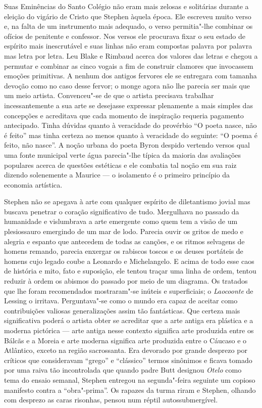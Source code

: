 Suas Eminências do Santo Colégio não eram mais zelosas e solitárias
durante a eleição do vigário de Cristo que Stephen àquela época.  Ele
escreveu muito verso e, na falta de um instrumento mais adequado, o
verso permitia"-lhe combinar os ofícios de penitente e confessor.  Nos
versos ele procurava fixar o seu estado de espírito mais inescrutável e
suas linhas não eram compostas palavra por palavra mas letra por letra.
Leu Blake e Rimbaud acerca dos valores das letras e chegou a permutar
e combinar as cinco vogais a fim de construir clamores que invocassem
emoções primitivas.  A nenhum dos antigos fervores ele se entregara com
tamanha devoção como no caso desse fervor; \label{o"-monge} o monge agora não lhe
parecia ser mais que um meio artista.  Convenceu"-se de que o artista
precisava trabalhar incessantemente a sua arte se desejasse expressar
plenamente a mais simples das concepções e acreditava que cada momento
de inspiração requeria pagamento antecipado.  Tinha dúvidas quanto à
veracidade do provérbio “O poeta nasce, não é feito” mas tinha
certeza ao menos quanto à veracidade do
seguinte: “O poema é feito, não nasce”.
A noção urbana do poeta Byron despido vertendo versos
qual uma fonte municipal verte água parecia"-lhe típica da maioria das
avaliações populares acerca de questões estéticas e ele combatia tal
noção em sua raiz \label{dizendo"-solenemente} dizendo solenemente a Maurice --- o isolamento é o
primeiro princípio da economia artística.

Stephen não se apegava à arte com qualquer espírito de diletantismo
jovial mas buscava penetrar o coração significativo de tudo.
\label{mergulhava"-no} Mergulhava no passado da humanidade e vislumbrava a arte emergente
como quem tem a visão de um plesiossauro emergindo de um mar de lodo.
Parecia ouvir os gritos de medo e alegria e espanto que
antecedem de todas as canções, e os ritmos selvagens de homens
remando, parecia enxergar os rabiscos toscos e os deuses portáteis de
homens cujo legado coube a Leonardo e Michelangelo.  E acima de todo
esse caos de história e mito, fato e suposição, ele tentou traçar uma
linha de ordem, tentou reduzir à ordem os abismos do passado por meio
de um diagrama.  Os tratados que lhe foram recomendados mostraram"-se
inúteis e superficiais; o \textit{Laocoonte} de Lessing o irritava.
Perguntava"-se como o mundo era capaz de aceitar como contribuições
valiosas generalizações assim tão fantásticas.  Que certeza mais
significativa poderá o artista obter se acreditar que a arte antiga era
plástica e a moderna pictórica --- arte antiga nesse contexto significa
arte produzida entre os Bálcãs e a Moreia e arte moderna significa arte
produzida entre o Cáucaso e o Atlântico, exceto na região sacrossanta.
Era devorado por grande desprezo por críticos que consideravam “grego”
e “clássico” termos sinônimos e ficava tomado por uma raiva tão
incontrolada que quando padre Butt designou
\textit{Otelo} como tema do ensaio semanal, Stephen entregou na
segunda"-feira seguinte um copioso manifesto contra a “obra"-prima”.  Os
rapazes da turma riram e Stephen, olhando com desprezo as caras
risonhas, pensou num réptil autossubmergível.

